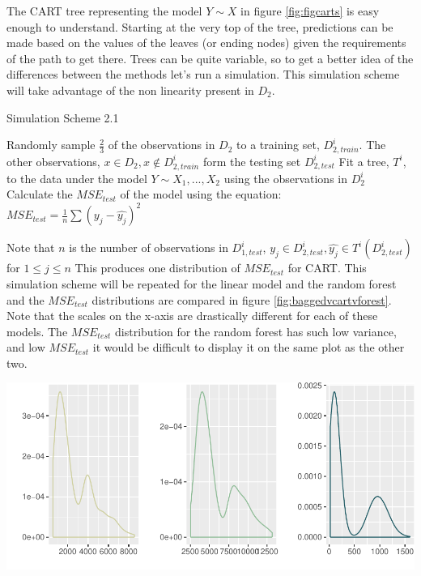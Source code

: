 \documentclass[12pt,twoside]{reedthesis}
\let\origfigure\figure
\let\endorigfigure\endfigure
\renewenvironment{figure}[1][2] {
    \expandafter\origfigure\expandafter[H]
} {
    \endorigfigure
}
\begin{document}
  The CART tree representing the model \(Y \sim X\) in figure
  \ref{fig:figcarts} is easy enough to understand. Starting at the very
  top of the tree, predictions can be made based on the values of the
  leaves (or ending nodes) given the requirements of the path to get
  there. Trees can be quite variable, so to get a better idea of the
  differences between the methods let's run a simulation. This simulation
  scheme will take advantage of the non linearity present in \(D_2\).
  
  \begin{algorithm}
  \caption{Simulation Scheme 2.1}
  \label{sim2.1}
  \begin{algorithmic}[1]
  \State Randomly sample $\frac 2 3$  of the observations in  $D_2$  to a training set,  $D_{2, train}^i$. The other observations,  $x \in D_2, x \notin D_{2, train}^i$ form the testing set $D_{2, test}^i$
  \State Fit a tree, $T^i$, to the data under the model $Y \sim X_1,...,X_2$ using the observations in $D_{2}^i$
  \State Calculate the $MSE_{test}$ of the model using the equation:
      $MSE_{test} = \frac 1 n \sum (y_j - \hat{y_j})^2$
  \EndFor
  \end{algorithmic}
  \end{algorithm}
  
  Note that \(n\) is the number of observations in \(D_{1, test}^i\),
  \(y_j \in D_{2, test}^i, \hat{y_j} \in T^i(D_{2, test}^i)\) for
  \(1 \leq j \leq n\) This produces one distribution of \(MSE_{test}\) for
  CART. This simulation scheme will be repeated for the linear model and
  the random forest and the \(MSE_{test}\) distributions are compared in
  figure \ref{fig:baggedvcartvforest}. Note that the scales on the x-axis
  are drastically different for each of these models. The \(MSE_{test}\)
  distribution for the random forest has such low variance, and low
  \(MSE_{test}\) it would be difficult to display it on the same plot as
  the other two.
  
  \begin{figure}[htbp]
  \centering
  \includegraphics{Thesis_files/figure-latex/unnamed-chunk-20-1.pdf}
  \caption{\label{fig:unnamed-chunk-20}\label{fig:baggedvcartvforest}The
  simulated MSE distributions of CART, linear model, and the random forest
  on D2}
  \end{figure}
  
\end{document}
